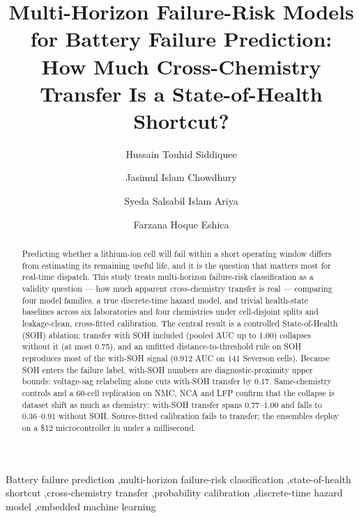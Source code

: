 \documentclass[preprint,12pt]{elsarticle}
\begin{document}
\begin{frontmatter}
\title{Multi-Horizon Failure-Risk Models for Battery Failure Prediction: How Much Cross-Chemistry Transfer Is a State-of-Health Shortcut?}
\author[1]{Hussain Touhid Siddiquee}
\author[1]{Jasimul Islam Chowdhury}
\author[1]{Syeda Salsabil Islam Ariya}
\author[1]{Farzana Hoque Eshica}
\address[1]{Leading University, Sylhet 3100, Bangladesh}
\vspace{-2\baselineskip}
\begin{abstract}
Predicting whether a lithium-ion cell will fail within a short operating window differs from estimating its remaining useful life, and it is the question that matters most for real-time dispatch. This study treats multi-horizon failure-risk classification as a validity question --- how much apparent cross-chemistry transfer is real --- comparing four model families, a true discrete-time hazard model, and trivial health-state baselines across six laboratories and four chemistries under cell-disjoint splits and leakage-clean, cross-fitted calibration. The central result is a controlled State-of-Health (SOH) ablation: transfer with SOH included (pooled AUC up to 1.00) collapses without it (at most 0.75), and an unfitted distance-to-threshold rule on SOH reproduces most of the with-SOH signal (0.912 AUC on 141 Severson cells). Because SOH enters the failure label, with-SOH numbers are diagnostic-proximity upper bounds: voltage-sag relabeling alone cuts with-SOH transfer by 0.17. Same-chemistry controls and a 60-cell replication on NMC, NCA and LFP confirm that the collapse is dataset shift as much as chemistry: with-SOH transfer spans 0.77--1.00 and falls to 0.36--0.91 without SOH. Source-fitted calibration fails to transfer; the ensembles deploy on a \$12 microcontroller in under a millisecond.
\end{abstract}
\begin{keyword}
Battery failure prediction \sep multi-horizon failure-risk classification \sep state-of-health shortcut \sep cross-chemistry transfer \sep probability calibration \sep discrete-time hazard model \sep embedded machine learning
\end{keyword}
\end{frontmatter}
\end{document}
